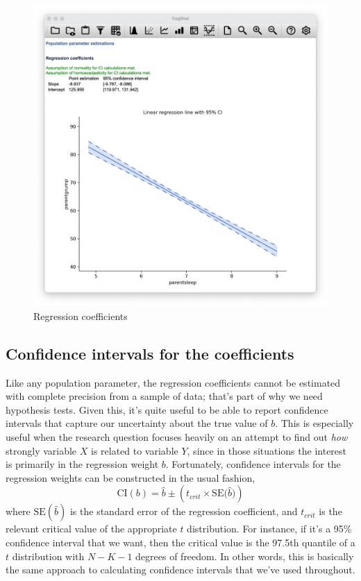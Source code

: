 \documentclass[
  11pt,
  a4paper,
  twoside,symmetric,openright]{book}
\theoremstyle{break}
\theoremstyle{break}
\begin{document}
\begin{figure}

{\centering \includegraphics[width=0.6\linewidth]{resources/image/cogstatregressioncoeff} 

}

\caption{Regression coefficients}\label{fig:parentregressionresults}
\end{figure}

\subsection{Confidence intervals for the coefficients}\label{confidence-intervals-for-the-coefficients}

Like any population parameter, the regression coefficients cannot be estimated with complete precision from a sample of data; that's part of why we need hypothesis tests. Given this, it's quite useful to be able to report confidence intervals that capture our uncertainty about the true value of \(b\). This is especially useful when the research question focuses heavily on an attempt to find out \emph{how} strongly variable \(X\) is related to variable \(Y\), since in those situations the interest is primarily in the regression weight \(b\). Fortunately, confidence intervals for the regression weights can be constructed in the usual fashion,
\[
\mbox{CI}(b) = \hat{b} \pm \left( t_{crit} \times \mbox{SE}({\hat{b})}  \right)
\]
where \(\mbox{SE}({\hat{b}})\) is the standard error of the regression coefficient, and \(t_{crit}\) is the relevant critical value of the appropriate \(t\) distribution. For instance, if it's a 95\% confidence interval that we want, then the critical value is the 97.5th quantile of a \(t\) distribution with \(N-K-1\) degrees of freedom. In other words, this is basically the same approach to calculating confidence intervals that we've used throughout.
\end{document}
